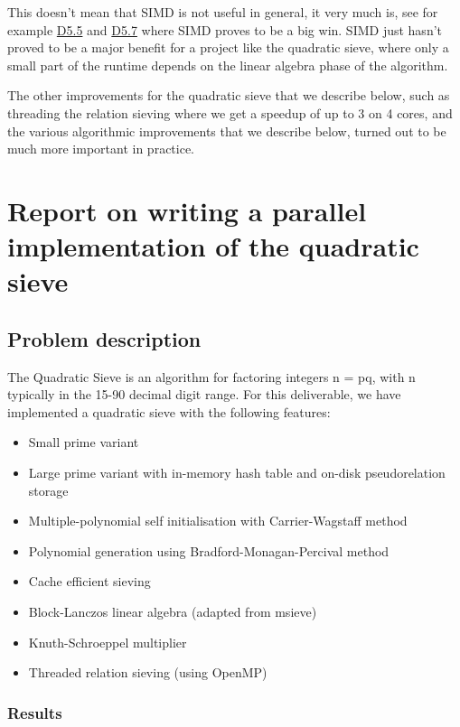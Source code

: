 This doesn't mean that SIMD is not useful in general, it very much is,
see for example
\href{https://github.com/OpenDreamKit/OpenDreamKit/issues/118}{D5.5} and
\href{https://github.com/OpenDreamKit/OpenDreamKit/issues/120}{D5.7}
where SIMD proves to be a big win. SIMD just hasn't proved to be a major
benefit for a project like the quadratic sieve, where only a small part
of the runtime depends on the linear algebra phase of the algorithm.

The other improvements for the quadratic sieve that we describe below,
such as threading the relation sieving where we get a speedup of up to 3
on 4 cores, and the various algorithmic improvements that we describe
below, turned out to be much more important in practice.

\section{Report on writing a parallel implementation of the quadratic
sieve}\label{report-on-writing-a-parallel-implementation-of-the-quadratic-sieve}

\subsection{Problem description}\label{problem-description}

The Quadratic Sieve is an algorithm for factoring integers n = pq, with
n typically in the 15-90 decimal digit range. For this deliverable, we
have implemented a quadratic sieve with the following features:

\begin{itemize}
\tightlist
\item
  Small prime variant
\item
  Large prime variant with in-memory hash table and on-disk
  pseudorelation storage
\item
  Multiple-polynomial self initialisation with Carrier-Wagstaff method
\item
  Polynomial generation using Bradford-Monagan-Percival method
\item
  Cache efficient sieving
\item
  Block-Lanczos linear algebra (adapted from msieve)
\item
  Knuth-Schroeppel multiplier
\item
  Threaded relation sieving (using OpenMP)
\end{itemize}

\subsubsection{Results}\label{results}

